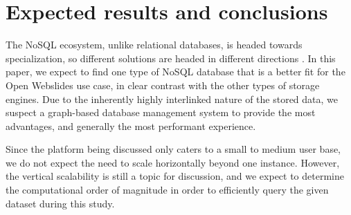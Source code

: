 \documentclass[fleqn,10pt]{voorstel}
\begin{document}
\section{Expected results and conclusions}
\label{sec:expected_results_and_conclusions}

The NoSQL ecosystem, unlike relational databases, is headed towards specialization, so different solutions are headed in different directions \autocite{Maroo2013}. In this paper, we expect to find one type of NoSQL database that is a better fit for the Open Webslides use case, in clear contrast with the other types of storage engines. Due to the inherently highly interlinked nature of the stored data, we suspect a graph-based database management system to provide the most advantages, and generally the most performant experience.

Since the platform being discussed only caters to a small to medium user base, we do not expect the need to scale horizontally beyond one instance. However, the vertical scalability is still a topic for discussion, and we expect to determine the computational order of magnitude in order to efficiently query the given dataset during this study.


\printbibliography[heading=bibintoc]
\end{document}
